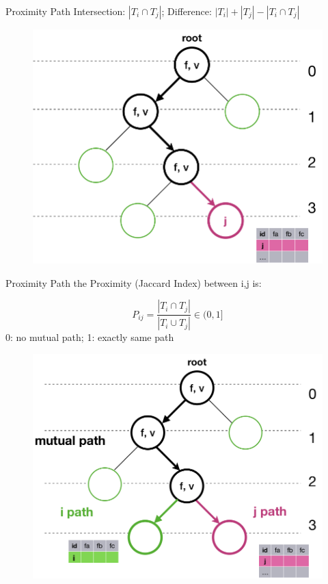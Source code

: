\documentclass[shortpres]{beamer}
\begin{document}
  \begin{frame}{Proximity Path}	
    Intersection: $|T_i \cap T_j|$; Difference: $|T_i|+ |T_j|-|T_i \cap T_j|$
    \begin{figure}
      \includegraphics[height=0.6\textheight]{fig/ppath2.png}
    \end{figure}
  \end{frame}
  \begin{frame}{Proximity Path}	
  the Proximity (Jaccard Index) between i,j is:

  $$P_{ij}=\frac{|T_i \cap T_j|}{|T_i \cup T_j|} \in (0,1]$$ 0: no mutual path; 1: exactly same path
    \begin{figure}
      \includegraphics[height=0.5\textheight]{fig/ppath3.png}
    \end{figure}
  \end{frame}
\end{document}
